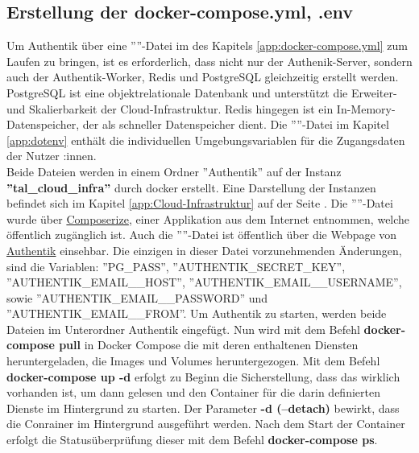 \subsection{Erstellung der docker-compose.yml, .env}
\label{sec:Erstellung der docker-compose.yml, .env}
Um Authentik über eine ''''-Datei im  des Kapitels \ref{app:docker-compose.yml} 
zum Laufen zu bringen, ist es erforderlich, dass nicht nur der Authenik-Server, sondern auch der Authentik-Worker, 
Redis und PostgreSQL gleichzeitig erstellt werden. PostgreSQL ist eine objektrelationale Datenbank und unterstützt 
die Erweiter- und Skalierbarkeit der Cloud-Infrastruktur. Redis hingegen ist ein In-Memory-Datenspeicher, der als 
schneller Datenspeicher dient. Die ''''-Datei im Kapitel \ref{app:dotenv}  
enthält die individuellen Umgebungsvariablen für die Zugangsdaten der Nutzer :innen. 
\\Beide Dateien werden in einem Ordner ''Authentik'' auf der Instanz \textbf{''tal\_cloud\_infra''} durch docker erstellt. 
Eine Darstellung der Instanzen befindet sich im Kapitel \ref{app:Cloud-Infrastruktur}   auf der Seite 
\pageref{app:Cloud-Infrastruktur}. Die ''''-Datei wurde über \href{https://www.composerize.com/}{Composerize}, einer 
Applikation aus dem Internet entnommen, welche öffentlich zugänglich ist. Auch die ''''-Datei ist öffentlich über die 
Webpage von \href{https://goauthentik.io/}{Authentik} einsehbar. Die einzigen in dieser Datei vorzunehmenden Änderungen, sind die Variablen: 
''PG\_PASS'', ''AUTHENTIK\_SECRET\_KEY'', ''AUTHENTIK\_EMAIL\_\_HOST'', ''AUTHENTIK\_EMAIL\_\_USERNAME'', sowie ''AUTHENTIK\_EMAIL\_\_PASSWORD'' 
und ''AUTHENTIK\_EMAIL\_\_FROM''. Um Authentik zu starten, werden beide Dateien im Unterordner Authentik eingefügt. Nun wird mit dem Befehl 
\textbf{docker-compose pull} in Docker Compose die \textbf{} mit deren enthaltenen Diensten heruntergeladen, 
die Images und Volumes heruntergezogen. Mit dem Befehl \textbf{docker-compose up -d} erfolgt zu Beginn die Sicherstellung, dass das 
 wirklich vorhanden ist, um dann gelesen und den Container für die darin definierten Dienste im Hintergrund zu starten. Der 
Parameter \textbf{-d (--detach)} bewirkt, dass die Conrainer im Hintergrund ausgeführt werden. Nach dem Start der Container erfolgt die Statusüberprüfung dieser 
mit dem Befehl \textbf{docker-compose ps}.

